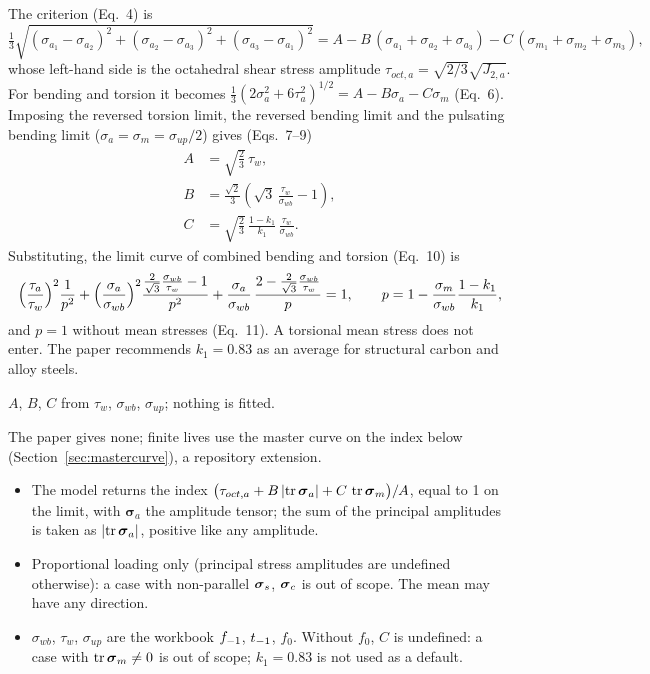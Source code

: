  The criterion (Eq.~4) is
\begin{equation}
\tfrac13\sqrt{(\sigma_{a_1}-\sigma_{a_2})^2+(\sigma_{a_2}-\sigma_{a_3})^2+(\sigma_{a_3}-\sigma_{a_1})^2}
 = A - B\,(\sigma_{a_1}+\sigma_{a_2}+\sigma_{a_3}) - C\,(\sigma_{m_1}+\sigma_{m_2}+\sigma_{m_3}) ,
\label{eq:kk}
\end{equation}
whose left-hand side is the octahedral shear stress amplitude $\tau_{oct,a}=\sqrt{2/3}\sqrt{J_{2,a}}$.
For bending and torsion it becomes $\tfrac13(2\sigma_a^2+6\tau_a^2)^{1/2}=A-B\sigma_a-C\sigma_m$
(Eq.~6). Imposing the reversed torsion limit, the reversed bending limit and the pulsating bending
limit ($\sigma_a=\sigma_m=\sigma_{up}/2$) gives (Eqs.~7--9)
\begin{align}
A &= \sqrt{\tfrac23}\,\tau_w , \label{eq:kk-A}\\
B &= \frac{\sqrt2}{3}\left(\sqrt3\,\frac{\tau_w}{\sigma_{wb}} - 1\right), \label{eq:kk-B}\\
C &= \sqrt{\tfrac23}\,\frac{1-k_1}{k_1}\,\frac{\tau_w}{\sigma_{wb}} . \label{eq:kk-C}
\end{align}
Substituting, the limit curve of combined bending and torsion (Eq.~10) is
\begin{equation}
\Bigl(\frac{\tau_a}{\tau_w}\Bigr)^2\frac{1}{p^2}
+ \Bigl(\frac{\sigma_a}{\sigma_{wb}}\Bigr)^2\frac{\tfrac{2}{\sqrt3}\tfrac{\sigma_{wb}}{\tau_w}-1}{p^2}
+ \frac{\sigma_a}{\sigma_{wb}}\,\frac{2-\tfrac{2}{\sqrt3}\tfrac{\sigma_{wb}}{\tau_w}}{p} = 1 ,
\qquad p = 1 - \frac{\sigma_m}{\sigma_{wb}}\frac{1-k_1}{k_1} ,
\end{equation}
and $p=1$ without mean stresses (Eq.~11). A torsional mean stress does not enter. The paper
recommends $k_1=0.83$ as an average for structural carbon and alloy steels.

 $A$, $B$, $C$ from $\tau_w$, $\sigma_{wb}$, $\sigma_{up}$; nothing
is fitted.

 The paper gives none; finite lives use the master curve on the index below
(Section~\ref{sec:mastercurve}), a repository extension.

\begin{itemize}
\item The model returns the index
  $\bigl(\tau_{oct,a} + B\,\lvert\operatorname{tr}\boldsymbol\sigma_a\rvert + C\,\operatorname{tr}\boldsymbol\sigma_m\bigr)/A$, equal to 1 on the
  limit, with $\boldsymbol\sigma_a$ the amplitude tensor; the sum of the principal amplitudes is
  taken as $\lvert\operatorname{tr}\boldsymbol\sigma_a\rvert$, positive like any amplitude.
\item Proportional loading only (principal stress amplitudes are undefined otherwise): a case with
  non-parallel $\boldsymbol\sigma_s$, $\boldsymbol\sigma_c$ is out of scope. The mean may have any direction.
\item $\sigma_{wb}$, $\tau_w$, $\sigma_{up}$ are the workbook $f_{-1}$, $t_{-1}$, $f_0$. Without $f_0$, $C$
  is undefined: a case with $\operatorname{tr}\boldsymbol\sigma_m\neq0$ is out of scope; $k_1=0.83$ is not used as a default.
\end{itemize}

